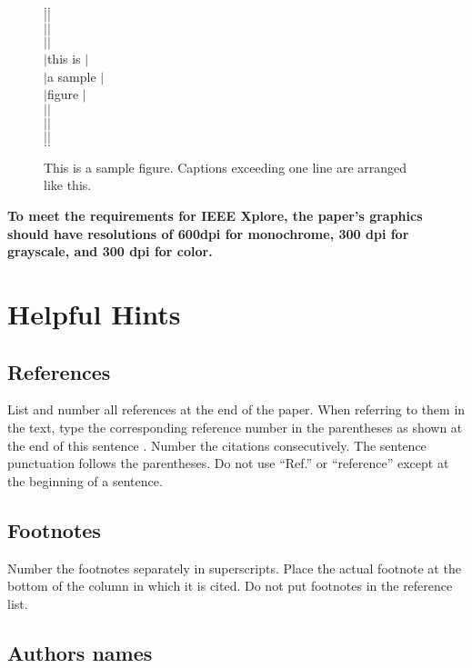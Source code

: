 \documentclass[conference]{IEEEtran}
\begin{document}
\begin{figure}[tb]
	\begin{center}
		\begin{minipage}{5cm}
			$.$\hrulefill $.$\\$|$\hfill $|$\\$|$\hfill $|$\\$|$\hfill $|$\\
			$|$\hfill this is \hfill $|$\\
			$|$\hfill a sample \hfill $|$\\
			$|$\hfill  figure  \hfill $|$\\
			$|$\hfill $|$\\$|$\hfill $|$\\$|$\hfill $|$\\$.$\hrulefill $.$\\
		\end{minipage}
		\caption{This is a sample figure. Captions exceeding
			one line are arranged like this.}
	\end{center}
\end{figure}

{\bf
	To meet the requirements for IEEE Xplore, the paper's graphics
	should have resolutions of 600dpi for monochrome, 300 dpi for 
	grayscale, and 300 dpi for color.}

\section{Helpful Hints}

\subsection{References}
List and number all references at the end of the paper. When referring
to them in the text, type the corresponding reference number in the
parentheses as shown at the end of this sentence \cite{key}. Number
the citations consecutively. The sentence punctuation follows the
parentheses. Do not use ``Ref.\cite{baz}'' or
``reference\cite{baz}'' except at the beginning of a sentence.

\subsection{Footnotes}
Number the footnotes separately in superscripts. Place the actual
footnote at the bottom of the column in which it is cited. Do not put
footnotes in the reference list.

\subsection{Authors names}
\end{document}
